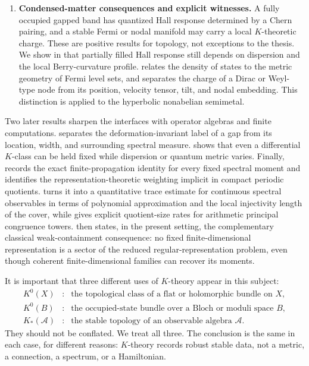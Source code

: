 \documentclass[11pt]{article}
\theoremstyle{definition}
\theoremstyle{remark}
\begin{document}
\begin{enumerate}[label=\textup{(\Roman*)},leftmargin=2.8em]
\item \textbf{Condensed-matter consequences and explicit witnesses.}
  A fully occupied gapped band has quantized Hall response determined by a
  Chern pairing, and a stable Fermi or nodal manifold may carry a local
  \(K\)-theoretic charge.  These are positive results for topology, not
  exceptions to the thesis.  We show in  that
  partially filled Hall response still depends on dispersion and the local
  Berry-curvature profile.   relates the density of
  states to the metric geometry of Fermi level sets, and
   separates the charge of a Dirac or Weyl-type node
  from its position, velocity tensor, tilt, and nodal embedding.  This
  distinction is applied to the hyperbolic nonabelian semimetal.
\end{enumerate}

Two later results sharpen the interfaces with operator algebras and finite
computations.   separates the deformation-invariant
label of a gap from its location, width, and surrounding spectral measure.
 shows that even a differential
\(K\)-class can be held fixed while dispersion or quantum metric varies.
Finally,  records the exact
finite-propagation identity for every fixed spectral moment and identifies
the representation-theoretic weighting implicit in compact periodic
quotients.   turns it into a
quantitative trace estimate for continuous spectral observables in terms of
polynomial approximation and the local injectivity length of the cover, while
 gives explicit quotient-size rates for
arithmetic principal congruence towers.
 then states, in the present setting,
the complementary classical weak-containment consequence: no fixed
finite-dimensional representation is a sector of the reduced
regular-representation problem, even though coherent finite-dimensional
families can recover its moments.

It is important that three different uses of \(K\)-theory appear in this
subject:
\[
\begin{array}{ccl}
K^0(X) &:& \text{the topological class of a flat or holomorphic bundle on }X,\\
K^0(B) &:& \text{the occupied-state bundle over a Bloch or moduli space }B,\\
K_*(\mathcal A) &:& \text{the stable topology of an observable algebra }\mathcal A.
\end{array}
\tag{1.5}\label{eq:three-k}
\]
They should not be conflated.  We treat all three.  The conclusion is the same
in each case, for different reasons: \(K\)-theory records robust stable data,
not a metric, a connection, a spectrum, or a Hamiltonian.
\end{document}
